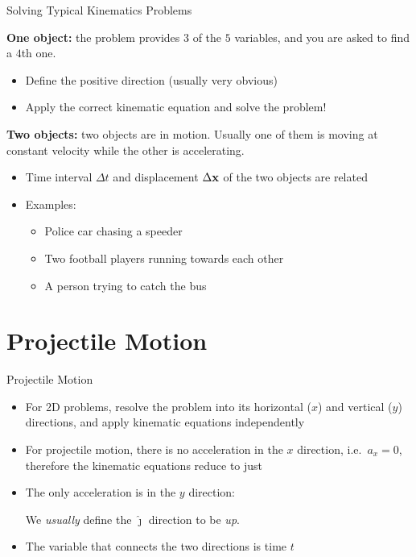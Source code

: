 \documentclass[12pt,compress,aspectratio=169]{beamer}
\newcommand{\mb}[1]{\ensuremath\mathbf{#1}}
\newcommand{\eq}[2]{\vspace{#1}{\Large\begin{displaymath}#2\end{displaymath}}}
\begin{document}
\begin{frame}{Solving Typical Kinematics Problems}
  
  \textbf{One object:} the problem provides $3$ of the $5$ variables, and you
  are asked to find a $4$th one.
  \begin{itemize}
  \item Define the positive direction (usually very obvious)
  \item Apply the correct kinematic equation and solve the problem!
  \end{itemize}

  \vspace{.2in}\textbf{Two objects:} two objects are in motion. Usually one of
  them is moving at constant velocity while the other is accelerating.
  \begin{itemize}
  \item Time interval $\Delta t$ and displacement $\Delta\mb{x}$ of the two
    objects are related
  \item Examples:
    \begin{itemize}
    \item Police car chasing a speeder
    \item Two football players running towards each other
    \item A person trying to catch the bus
    \end{itemize}
  \end{itemize}
\end{frame}


\section{Projectile Motion}
\begin{frame}{Projectile Motion}
  \begin{itemize}
  \item For 2D problems, resolve the problem into its
    horizontal ($x$) and vertical ($y$) directions, and apply kinematic
    equations independently
  \item For projectile motion, there is no acceleration in the $x$ direction,
    i.e.\ $a_x=0$, therefore the kinematic equations reduce to just
    
    \eq{-.35in}{\Delta x=v_xt\bm{\hat{\imath}}}
  \item The only acceleration is in the $y$ direction:
    
    \eq{-.25in}{a_y=-g\bm{\hat{\jmath}}=\SI{9.81}{m/s^2}\bm{\hat{\jmath}}}

    \vspace{-.15in}We \emph{usually} define the $\bm{\hat{\jmath}}$ direction
    to be \emph{up}.
  \item The variable that connects the two directions is time $t$
  \end{itemize}
\end{frame}
\end{document}
